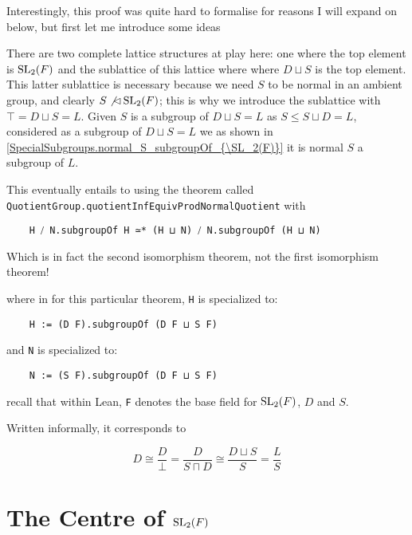 \begin{remark}
Interestingly, this proof was quite hard to formalise for reasons I will expand on below, but first let me introduce some ideas

There are two complete lattice structures at play here: one where the top element is $\operatorname{SL}_2(F)$ and the sublattice of this lattice where where $D \sqcup S$ is the top element.
This latter sublattice is necessary because we need $S$ to be normal in an ambient group, and clearly $S \not\lhd \operatorname{SL}_2(F)$; 
this is why we introduce the sublattice with $\top = D \sqcup S = L$. Given $S$ is a subgroup of $D \sqcup S = L$ as $S \le S\sqcup D = L$, considered as a subgroup of $D \sqcup S = L$ we as shown in \ref{SpecialSubgroups.normal_S_subgroupOf_{\SL_2(F)}}
it is normal $S$ a subgroup of $L$.

This eventually entails to using the theorem called \texttt{QuotientGroup.quotientInfEquivProdNormalQuotient} with

\begin{verbatim}
    H ⧸ N.subgroupOf H ≃* (H ⊔ N) ⧸ N.subgroupOf (H ⊔ N)
\end{verbatim}

Which is in fact the second isomorphism theorem, not the first isomorphism theorem! 

where in for this particular theorem, \texttt{H} is specialized to:

\begin{verbatim}
    H := (D F).subgroupOf (D F ⊔ S F)
\end{verbatim}

and  \texttt{N} is specialized to:

\begin{verbatim}
    N := (S F).subgroupOf (D F ⊔ S F)
\end{verbatim}

recall that within Lean, \texttt{F} denotes the base field for $\operatorname{SL}_2(F)$, $D$ and $S$.

Written informally, it corresponds to

\[
D \cong \frac{D}{\bot} = \frac{D}{S \sqcap D} \cong \frac{D \sqcup S}{S} = \frac{L}{S}
\]


\end{remark}

\section[The Centre of $L$]{The Centre of $\operatorname{SL}_2(F)$}

